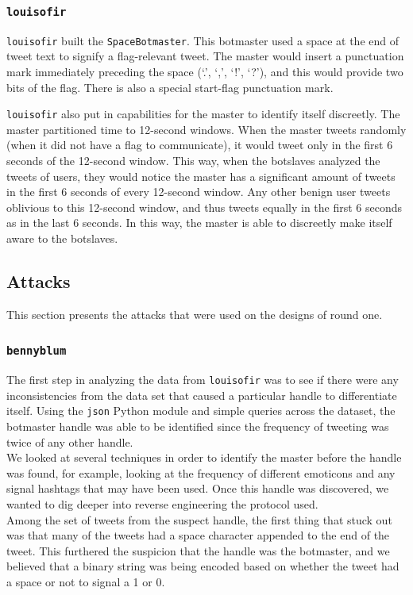 \documentclass[11pt, oneside]{article} %
\numberwithin{equation}{section} %
\numberwithin{figure}{section} %
\numberwithin{table}{section} %
\renewcommand{\c}[1]{\texttt{#1}}
\newcommand{\teambb}{\c{bennyblum}}
\newcommand{\teamol}{\c{louisofir}}
\begin{document}
			
		\subsubsection{\teamol{}}
			\teamol{} built the \c{SpaceBotmaster}. This botmaster used a space at the end of tweet text to signify a flag-relevant tweet. The master would insert a punctuation mark immediately preceding the space (`.', `,', `!', `?'), and this would provide two bits of the flag. There is also a special start-flag punctuation mark. 

			\teamol{} also put in capabilities for the master to identify itself discreetly. The master partitioned time to 12-second windows. When the master tweets randomly (when it did not have a flag to communicate), it would tweet only in the first 6 seconds of the 12-second window. This way, when the botslaves analyzed the tweets of users, they would notice the master has a significant amount of tweets in the first 6 seconds of every 12-second window. Any other benign user tweets oblivious to this 12-second window, and thus tweets equally in the first 6 seconds as in the last 6 seconds. In this way, the master is able to discreetly make itself aware to the botslaves.

	\subsection{Attacks}
		This section presents the attacks that were used on the designs of round one.

		\subsubsection{\teambb{}}
			The first step in analyzing the data from \teamol{} was to see if there were any inconsistencies from the data set that caused a particular handle to differentiate itself. Using the \c{json} Python module  and simple queries across the dataset, the botmaster handle was able to be identified since the frequency of tweeting was twice of any other handle. \\

			We looked at several techniques in order to identify the master before the handle was found, for example, looking at the frequency of different emoticons and any signal hashtags that may have been used. Once this handle was discovered, we wanted to dig deeper into reverse engineering the protocol used. \\

			Among the set of tweets from the suspect handle, the first thing that stuck out was that many of the tweets had a space character appended to the end of the tweet. This furthered the suspicion that the handle was the botmaster, and we believed that a binary string was being encoded based on whether the tweet had a space or not to signal a 1 or 0. \\
\end{document}

